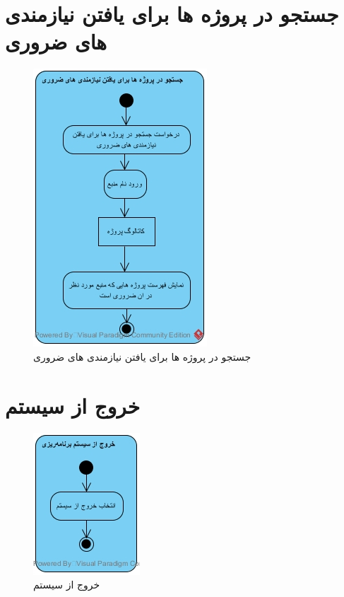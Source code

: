 \section{جستجو در پروژه ها برای یافتن نیازمندی های ضروری}
\begin{figure}[H]
	\centering
	\includegraphics[scale=1]{img/activity/findessen}
	\caption{جستجو در پروژه ها برای یافتن نیازمندی های ضروری}
\end{figure}


\section{خروج از سیستم}
\begin{figure}[H]
	\centering
	\includegraphics[scale=1]{img/activity/logout}
	\caption{خروج از سیستم}
\end{figure}


